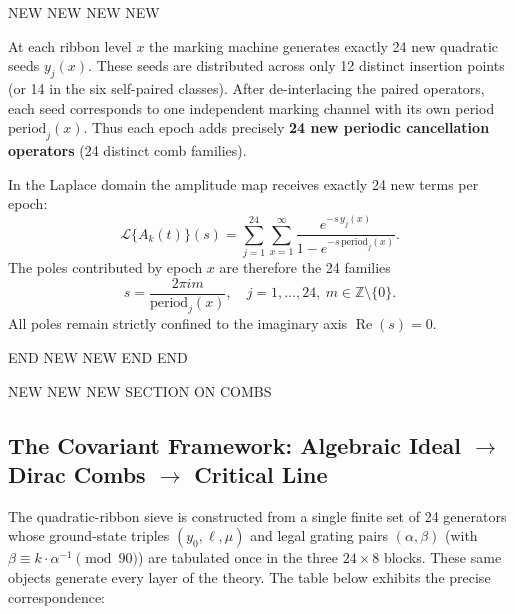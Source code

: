 \documentclass[11pt,a4paper]{article}
\begin{document}
NEW NEW NEW NEW

At each ribbon level \(x\) the marking machine generates exactly 24 new quadratic seeds \(y_j(x)\). These seeds are distributed across only 12 distinct insertion points (or 14 in the six self-paired classes). After de-interlacing the paired operators, each seed corresponds to one independent marking channel with its own period \(\text{period}_j(x)\). Thus each epoch adds precisely \textbf{24 new periodic cancellation operators} (24 distinct comb families).

In the Laplace domain the amplitude map receives exactly 24 new terms per epoch:
\[
\mathcal{L}\{A_k(t)\}(s) = \sum_{j=1}^{24} \sum_{x=1}^\infty \frac{e^{-s\, y_j(x)}}{1 - e^{-s\, \text{period}_j(x)}}.
\]
The poles contributed by epoch \(x\) are therefore the 24 families
\[
s = \frac{2\pi i m}{\text{period}_j(x)}, \quad j=1,\dots,24,\ m\in\mathbb{Z}\setminus\{0\}.
\]
All poles remain strictly confined to the imaginary axis \(\operatorname{Re}(s)=0\).

END NEW NEW END END

NEW NEW NEW SECTION ON COMBS
\subsection{The Covariant Framework: Algebraic Ideal $\to$ Dirac Combs $\to$ Critical Line}

The quadratic-ribbon sieve is constructed from a single finite set of 24 generators whose ground-state triples \((y_0,\ell,\mu)\) and legal grating pairs \((\alpha,\beta)\) (with \(\beta\equiv k\cdot\alpha^{-1}\pmod{90}\)) are tabulated once in the three \(24\times8\) blocks. These same objects generate every layer of the theory. The table below exhibits the precise correspondence:
\end{document}
